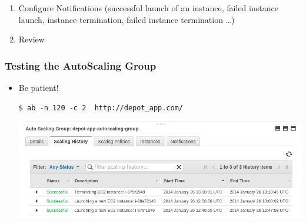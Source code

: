 \documentclass{beamer}
\begin{document}
\begin{frame}
\begin{enumerate}
\begin{center}
\end{center}
\item Configure Notifications (successful launch of an instance, failed instance launch, instance termination, failed instance termination \dots)
\item Review
\end{enumerate}
\end{frame}
\begin{frame}[fragile]
\frametitle{Testing the AutoScaling Group}

\lstset{language=shell}
\begin{itemize}
 \item Be patient!
  \begin{lstlisting}[escapechar=!]
     $ ab -n 120 -c 2  http://depot_app.com/
  \end{lstlisting}

\begin{center}
\includegraphics[scale=0.45]{autoscalingwork.png}
\end{center}
\end{itemize}




\end{frame}
\end{document}
